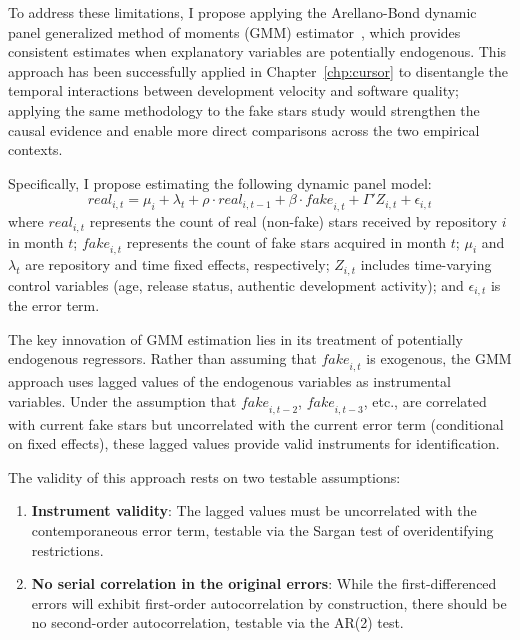 To address these limitations, I propose applying the Arellano-Bond dynamic panel generalized method of moments (GMM) estimator~\cite{arellano1991some}, which provides consistent estimates when explanatory variables are potentially endogenous.
This approach has been successfully applied in Chapter~\ref{chp:cursor} to disentangle the temporal interactions between development velocity and software quality; applying the same methodology to the fake stars study would strengthen the causal evidence and enable more direct comparisons across the two empirical contexts.

Specifically, I propose estimating the following dynamic panel model:
\begin{equation}
\label{eq:proposed-gmm-fake}
\textit{real}_{i,t} = \mu_i + \lambda_t + \rho \cdot \textit{real}_{i,t-1} + \beta \cdot \textit{fake}_{i,t} + \Gamma' Z_{i,t} + \epsilon_{i,t}
\end{equation}
where $\textit{real}_{i,t}$ represents the count of real (non-fake) stars received by repository $i$ in month $t$; $\textit{fake}_{i,t}$ represents the count of fake stars acquired in month $t$; $\mu_i$ and $\lambda_t$ are repository and time fixed effects, respectively; $Z_{i,t}$ includes time-varying control variables (age, release status, authentic development activity); and $\epsilon_{i,t}$ is the error term.

The key innovation of GMM estimation lies in its treatment of potentially endogenous regressors.
Rather than assuming that $\textit{fake}_{i,t}$ is exogenous, the GMM approach uses lagged values of the endogenous variables as instrumental variables.
Under the assumption that $\textit{fake}_{i,t-2}$, $\textit{fake}_{i,t-3}$, etc., are correlated with current fake stars but uncorrelated with the current error term (conditional on fixed effects), these lagged values provide valid instruments for identification.

The validity of this approach rests on two testable assumptions:
\begin{enumerate}[leftmargin=15pt]
    \item \textbf{Instrument validity}: The lagged values must be uncorrelated with the contemporaneous error term, testable via the Sargan test of overidentifying restrictions.
    \item \textbf{No serial correlation in the original errors}: While the first-differenced errors will exhibit first-order autocorrelation by construction, there should be no second-order autocorrelation, testable via the AR(2) test.
\end{enumerate}

